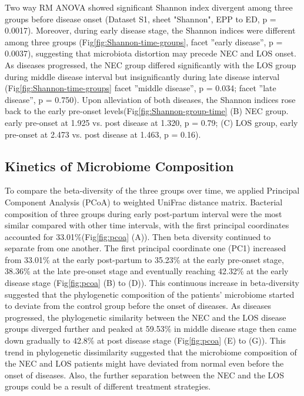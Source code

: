 \documentclass[fleqn,10pt, lineno]{wlpeerj} %
\begin{document}
    Two way RM ANOVA showed significant Shannon index divergent among three groups before disease onset (Dataset S1, sheet "Shannon", EPP to ED, p = 0.0017). Moreover, during early disease stage, the Shannon indices were different among three groups (Fig\ref{fig:Shannon-time-groups}, facet ”early disease”, p = 0.0037), suggesting that microbiota distortion may precede NEC and LOS onset. As diseases progressed, the NEC group differed significantly with the LOS group during middle disease interval but insignificantly  during late disease interval (Fig\ref{fig:Shannon-time-groups} facet ”middle disease”, p = 0.034; facet ”late disease”, p = 0.750). Upon alleviation of both diseases, the Shannon indices rose back to the early pre-onset levels(Fig\ref{fig:Shannon-group-time} (B) NEC group. early pre-onset at 1.925 vs. post disease at 1.320, p = 0.79; (C) LOS group, early pre-onset at 2.473 vs. post disease at 1.463, p = 0.16).


    \subsection*{Kinetics of Microbiome Composition}
    To compare the beta-diversity of the three groups over time, we applied Principal Component Analysis (PCoA) to weighted UniFrac distance matrix.
    Bacterial composition of three groups during early post-partum interval were the most similar compared with other time intervals, with the first principal coordinates accounted for 33.01\%(Fig\ref{fig:pcoa} (A)). Then beta diversity continued to separate from one another. The first principal coordinate one (PC1) increased from 33.01\% at the early post-partum to 35.23\% at the early pre-onset stage, 38.36\% at the late pre-onset stage and eventually reaching 42.32\% at the early disease stage (Fig\ref{fig:pcoa} (B) to (D)).  This continuous increase in beta-diversity suggested that the phylogenetic composition of the patients’ microbiome started to deviate from the control group before the onset of diseases. As diseases progressed, the phylogenetic similarity between the NEC and the LOS disease groups diverged further and peaked at 59.53\% in middle disease stage then came down gradually to 42.8\% at post disease stage (Fig\ref{fig:pcoa} (E) to (G)). This trend in phylogenetic dissimilarity suggested that the microbiome composition of the NEC and LOS patients might have deviated from normal even before the onset of diseases.  Also, the further separation between the NEC and the LOS groups could be a result of different treatment strategies.
\end{document}
